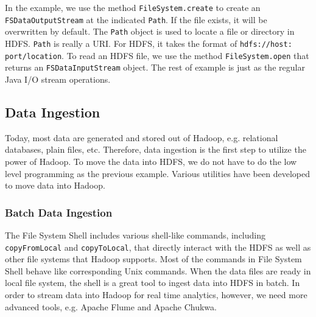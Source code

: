\documentclass[12pt]{book}
\begin{document}
In the example, we use the method \texttt{FileSystem.create} to create an \texttt{FSDataOutputStream} at the indicated \texttt{Path}. If the file exists, it will be overwritten by default. The \texttt{Path} object is used to locate a file or directory in HDFS. \texttt{Path} is really a URI. For HDFS, it takes the format of \texttt{hdfs://host: port/location}. To read an HDFS file, we use the method \texttt{FileSystem.open} that returns an \texttt{FSDataInputStream} object. The rest of example is just as the regular Java I/O stream operations.

\subsection[Data Ingestion]
{Data Ingestion}

Today, most data are generated and stored out of Hadoop, e.g. relational databases, plain files, etc. Therefore, data ingestion is the first step to utilize the power of Hadoop. To move the data into HDFS, we do not have to do the low level programming as the previous example. Various utilities have been developed to move data into Hadoop.

\subsubsection{Batch Data Ingestion}
The File System Shell \cite{HdfsShell} includes various shell-like commands, including \texttt{copyFromLocal} and \texttt{copyToLocal}, that directly interact with the HDFS as well as other file systems that Hadoop supports. Most of the commands in File System Shell behave like corresponding Unix commands. When the data files are ready in local file system, the shell is a great tool to ingest data into HDFS in batch. In order to stream data into Hadoop for real time analytics, however, we need more advanced tools, e.g. Apache Flume and Apache Chukwa. 
\end{document}
